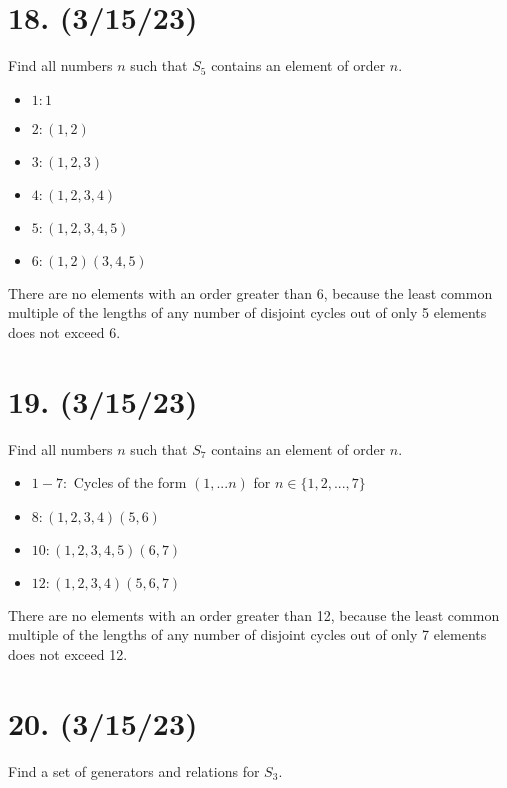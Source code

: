 \documentclass{article}
\begin{document}
\section*{18. (3/15/23)}

Find all numbers $n$ such that $S_5$ contains an element of order $n$.

\begin{itemize}
    \item $1: 1$
    \item $2: (1, 2)$
    \item $3: (1, 2, 3)$
    \item $4: (1, 2, 3, 4)$
    \item $5: (1, 2, 3, 4, 5)$
    \item $6: (1, 2)(3, 4, 5)$
\end{itemize}

There are no elements with an order greater than 6, because the least common multiple of the lengths of any number of disjoint cycles out of only 5 elements does not exceed 6.

\section*{19. (3/15/23)}

Find all numbers $n$ such that $S_7$ contains an element of order $n$.

\begin{itemize}
    \item $1-7:$ Cycles of the form $(1, ... n)$ for $n \in \{1, 2, ..., 7\}$
    \item $8: (1, 2, 3, 4)(5, 6)$
    \item $10: (1, 2, 3, 4, 5)(6, 7)$
    \item $12: (1, 2, 3, 4)(5, 6, 7)$
\end{itemize}

There are no elements with an order greater than 12, because the least common multiple of the lengths of any number of disjoint cycles out of only 7 elements does not exceed 12.

\section*{20. (3/15/23)}

Find a set of generators and relations for $S_3$.
\end{document}
